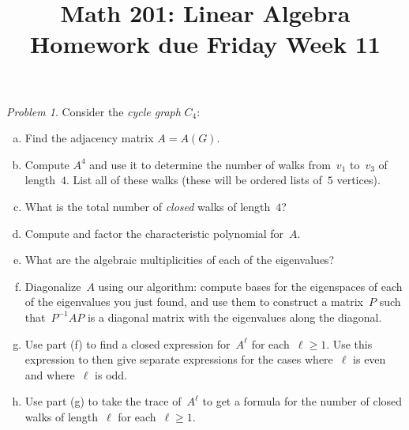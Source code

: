 \documentclass[11pt,twoside]{amsart}
\title{Math 201: Linear Algebra\\ Homework due Friday Week 11}
\theoremstyle{plain}
\theoremstyle{remark}
\newtheorem{prob}{Problem}
\theoremstyle{definition}
\theoremstyle{definition}
\begin{document}
\maketitle

\begin{prob}
Consider the {\em cycle graph} $C_4$:
\begin{center}
\end{center}
\begin{enumerate}[(a)]
 \item Find the adjacency matrix $A=A(G)$.
 \item Compute $A^4$ and use it to determine the number of walks from~$v_1$
   to~$v_3$ of length~$4$.  List all of these walks (these will be ordered lists
   of~$5$ vertices).
 \item What is the total number of {\em closed} walks of length~$4$?
\item Compute and factor the characteristic polynomial for~$A$.  
  
\item What are the algebraic multiplicities of each of the eigenvalues?

 \item Diagonalize~$A$ using our algorithm: compute bases for the eigenspaces of
   each of the eigenvalues you just found, and use them to construct a
   matrix~$P$ such that~$P^{-1}AP$ is a diagonal matrix with the eigenvalues along the diagonal.
 \item Use part (f) to find a closed expression
   for~$A^{\ell}$ for each~$\ell\geq 1$.  Use this expression to then give
   separate expressions for the cases where~$\ell$ is even and where~$\ell$ is
   odd.
 \item Use part (g) to take the trace of~$A^{\ell}$ to get a formula for the number of closed
   walks of length~$\ell$ for each~$\ell\geq 1$.
\end{enumerate}
\end{prob}

\end{document}
